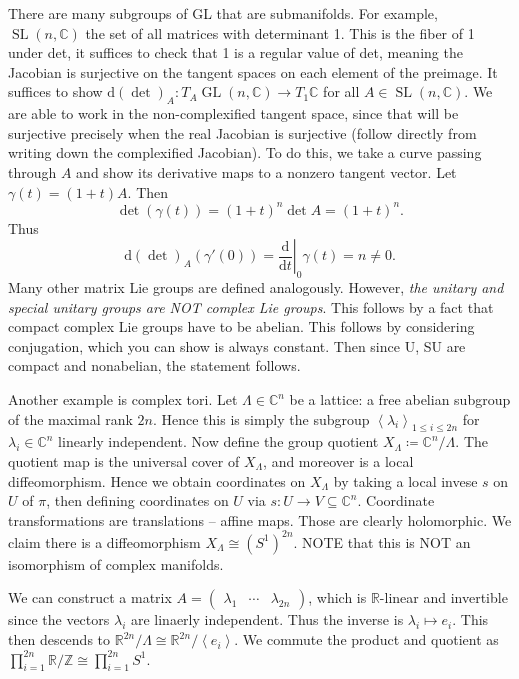 \begin{example}
	There are many subgroups of GL that are submanifolds. For example, $\operatorname{SL} (n,\mathbb{C} )$ the set of all matrices with determinant 1. This is the fiber of 1 under det, it suffices to check that 1 is a regular value of det, meaning the Jacobian is surjective on the tangent spaces on each element of the preimage. It suffices to show $\mathrm{d} (\det )_A : T_A \operatorname{GL} (n,\mathbb{C} ) \to T_1\mathbb{C} $ for all $A\in \operatorname{SL} (n,\mathbb{C} )$. We are able to work in the non-complexified tangent space, since that will be surjective precisely when the real Jacobian is surjective (follow directly from writing down the complexified Jacobian). To do this, we take a curve passing through $A$ and show its derivative maps to a nonzero tangent vector. Let $\gamma (t)=(1+t)A$. Then
	\[
		\det (\gamma (t))=(1+t)^n \det A = (1+t)^n
	.\]
	Thus
	\[
		\mathrm{d} (\det )_A(\gamma '(0)) = \left. \frac{\mathrm{d}}{\mathrm{d}t} \right|_0 \gamma (t) = n\neq 0
	.\]
	Many other matrix Lie groups are defined analogously. However, \emph{the unitary and special unitary groups are NOT complex Lie groups}. This follows by a fact that compact complex Lie groups have to be abelian. This follows by considering conjugation, which you can show is always constant. Then since U, SU are compact and nonabelian, the statement follows.

	Another example is complex tori. Let $\Lambda \in\mathbb{C} ^n$ be a lattice: a free abelian subgroup of the maximal rank $2n$. Hence this is simply the subgroup $\left\langle \lambda _i \right\rangle _{1\leq i\leq 2n} $ for $\lambda _i\in\mathbb{C} ^n$ linearly independent. Now define the group quotient $X_\Lambda \coloneqq \mathbb{C} ^n / \Lambda $. The quotient map is the universal cover of $X_\Lambda $, and moreover is a local diffeomorphism. Hence we obtain coordinates on $X_\Lambda $ by taking a local invese $s$ on $U$ of $\pi $, then defining coordinates on $U$ via $s : U \to V\subseteq \mathbb{C} ^n$. Coordinate transformations are translations -- affine maps. Those are clearly holomorphic. We claim there is a diffeomorphism $X_\Lambda \cong (S^1)^{2n} $. NOTE that this is NOT an isomorphism of complex manifolds.

	We can construct a matrix $A=\begin{pmatrix}
	\lambda _1 & \cdots  & \lambda _{2n} 
	\end{pmatrix}$, which is $\mathbb{R} $-linear and invertible since the vectors $\lambda _i$ are linaerly independent. Thus the inverse is $\lambda _i\mapsto e_i$. This then descends to $\mathbb{R} ^{2n} /\Lambda \cong \mathbb{R} ^{2n} / \left\langle e_i \right\rangle $. We commute the product and quotient as $\prod_{i=1} ^{2n} \mathbb{R} /\mathbb{Z} \cong \prod_{i=1} ^{2n} S^1$.


\end{example}
